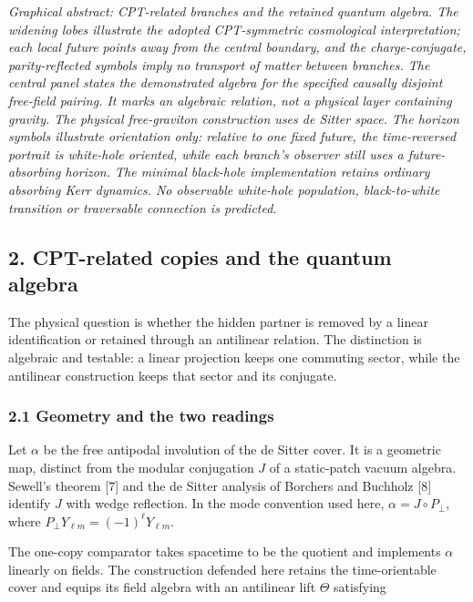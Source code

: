 \documentclass[
]{article}
\begin{document}
\emph{Graphical abstract: CPT-related branches and the retained quantum
algebra. The widening lobes illustrate the adopted CPT-symmetric
cosmological interpretation; each local future points away from the
central boundary, and the charge-conjugate, parity-reflected symbols
imply no transport of matter between branches. The central panel states
the demonstrated algebra for the specified causally disjoint free-field
pairing. It marks an algebraic relation, not a physical layer containing
gravity. The physical free-graviton construction uses de Sitter space.
The horizon symbols illustrate orientation only: relative to one fixed
future, the time-reversed portrait is white-hole oriented, while each
branch's observer still uses a future-absorbing horizon. The minimal
black-hole implementation retains ordinary absorbing Kerr dynamics. No
observable white-hole population, black-to-white transition or
traversable connection is predicted.}

\subsection{2. CPT-related copies and the quantum
algebra}\label{cpt-related-copies-and-the-quantum-algebra}

The physical question is whether the hidden partner is removed by a
linear identification or retained through an antilinear relation. The
distinction is algebraic and testable: a linear projection keeps one
commuting sector, while the antilinear construction keeps that sector
and its conjugate.

\subsubsection{2.1 Geometry and the two
readings}\label{geometry-and-the-two-readings}

Let \(\alpha\) be the free antipodal involution of the de Sitter cover.
It is a geometric map, distinct from the modular conjugation \(J\) of a
static-patch vacuum algebra. Sewell's theorem {[}7{]} and the de Sitter
analysis of Borchers and Buchholz {[}8{]} identify \(J\) with wedge
reflection. In the mode convention used here, \(\alpha=J\circ P_\perp\),
where \(P_\perp Y_{\ell m}=(-1)^\ell Y_{\ell m}\).

The one-copy comparator takes spacetime to be the quotient and
implements \(\alpha\) linearly on fields. The construction defended here
retains the time-orientable cover and equips its field algebra with an
antilinear lift \(\Theta\) satisfying
\end{document}
